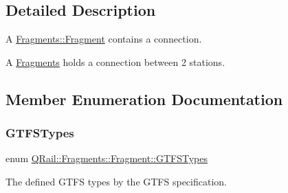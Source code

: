 \subsection{Detailed Description}
A \mbox{\hyperlink{classQRail_1_1Fragments_1_1Fragment}{Fragments\+::\+Fragment}} contains a connection. 

A \mbox{\hyperlink{namespaceQRail_1_1Fragments}{Fragments}} holds a connection between 2 stations. 

\subsection{Member Enumeration Documentation}
\mbox{\label{classQRail_1_1Fragments_1_1Fragment_ae3c308ba6dec16f36ecc5dba59f35af3}} 
\subsubsection{\texorpdfstring{GTFSTypes}{GTFSTypes}}
{\footnotesize\ttfamily enum \mbox{\hyperlink{classQRail_1_1Fragments_1_1Fragment_ae3c308ba6dec16f36ecc5dba59f35af3}{Q\+Rail\+::\+Fragments\+::\+Fragment\+::\+G\+T\+F\+S\+Types}}\hspace{0.3cm}{\ttfamily [strong]}}



The defined G\+T\+FS types by the G\+T\+FS specification. 

